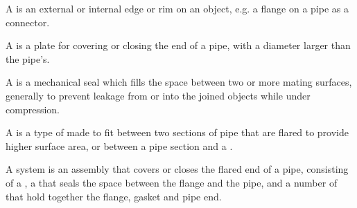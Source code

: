 \begin{module}[id=flange-bolt-gasket]
\begin{definition}
  A  is an external or internal edge or rim on an object, e.g. a flange on a
  pipe as a connector.
\end{definition}

\begin{definition}
  A  is a plate for covering or closing the end of a pipe, with a
  diameter larger than the pipe's.
\end{definition}

\begin{definition}
  A  is a mechanical seal which fills the space between two or more
  mating surfaces, generally to prevent leakage from or into the joined objects while
  under compression.
\end{definition}

\begin{definition}
  A  is a type of  made to fit between two sections of
  pipe that are flared to provide higher surface area, or between a pipe section and a
  .
\end{definition}

\begin{definition}
  A  system is an assembly that covers or closes the flared end
  of a pipe, consisting of a , a  that seals the space
  between the flange and the pipe, and a number of  that hold
  together the flange, gasket and pipe end.
\end{definition}
\end{module}


